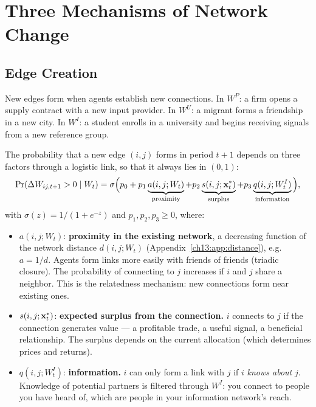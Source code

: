\documentclass[../structural_economics_book.tex]{subfiles}
\begin{document}
\section{Three Mechanisms of Network Change}
\label{ch13:sec:mechanisms}

\subsection{Edge Creation}

New edges form when agents establish new connections. In $W^P$: a firm opens a supply contract with a new input provider. In $W^U$: a migrant forms a friendship in a new city. In $W^I$: a student enrolls in a university and begins receiving signals from a new reference group.

\begin{definition}\label{ch13:def:creation}
The probability that a new edge $(i, j)$ forms in period $t+1$ depends on three factors through a logistic link, so that it always lies in $(0,1)$:
\begin{equation}\label{ch13:eq:creation}
\Pr(\Delta W_{ij,t+1} > 0 \mid W_t) = \sigma\Big(p_0 + p_1 \underbrace{a(i, j; W_t)}_{\text{proximity}} + p_2 \underbrace{s(i, j; \mathbf{x}_t^*)}_{\text{surplus}} + p_3 \underbrace{q(i, j; W^I_t)}_{\text{information}}\Big),
\end{equation}
with $\sigma(z) = 1/(1+e^{-z})$ and $p_1, p_2, p_3 \geq 0$, where:
\begin{itemize}
\item $a(i, j; W_t)$: \textbf{proximity in the existing network}, a decreasing function of the network distance $d(i,j;W_t)$ (Appendix~\ref{ch13:app:distance}), e.g.\ $a = 1/d$. Agents form links more easily with friends of friends (triadic closure). The probability of connecting to $j$ increases if $i$ and $j$ share a neighbor. This is the relatedness mechanism: new connections form near existing ones.
\item $s(i, j; \mathbf{x}_t^*)$: \textbf{expected surplus from the connection.} $i$ connects to $j$ if the connection generates value --- a profitable trade, a useful signal, a beneficial relationship. The surplus depends on the current allocation (which determines prices and returns).
\item $q(i, j; W^I_t)$: \textbf{information.} $i$ can only form a link with $j$ if $i$ \textit{knows about} $j$. Knowledge of potential partners is filtered through $W^I$: you connect to people you have heard of, which are people in your information network's reach.
\end{itemize}
\end{definition}
\end{document}
